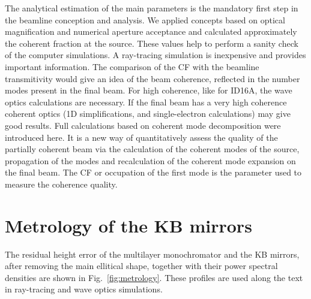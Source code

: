 \documentclass{iucr}              %
\newcommand{\todo}[1]{{\color{red}[TODO: "#1'']}}
\begin{document}
The analytical estimation of the main parameters is the mandatory first step in the beamline conception and analysis. We applied concepts based on optical magnification and numerical aperture acceptance and calculated approximately the coherent fraction at the source. These values help to perform a sanity check of the computer simulations. A ray-tracing simulation is inexpensive and provides important information. The comparison of the CF with the beamline transmitivity would give an idea of the beam coherence, reflected in the number modes present in the final beam. For high coherence, like for ID16A, the wave optics calculations are necessary. If the final beam has a very high coherence coherent optics (1D simplifications, and single-electron calculations) may give good results. Full calculations based on coherent mode decomposition were introduced here. It is a new way of quantitatively assess the quality of the partially coherent beam via the calculation of the coherent modes of the source, propagation of the modes and recalculation of the coherent mode expansion on the final beam. The CF or occupation of the first mode is the parameter used to measure the coherence quality. 


% 


\appendix

\section{Metrology of the KB mirrors}
\label{appendix:metrology}
The residual height error of the multilayer monochromator and the KB mirrors, after removing the main ellitical shape, together with their power spectral densities are shown in Fig.~\ref{fig:metrology}. These profiles are used along the text in ray-tracing and wave optics simulations.
\end{document}
